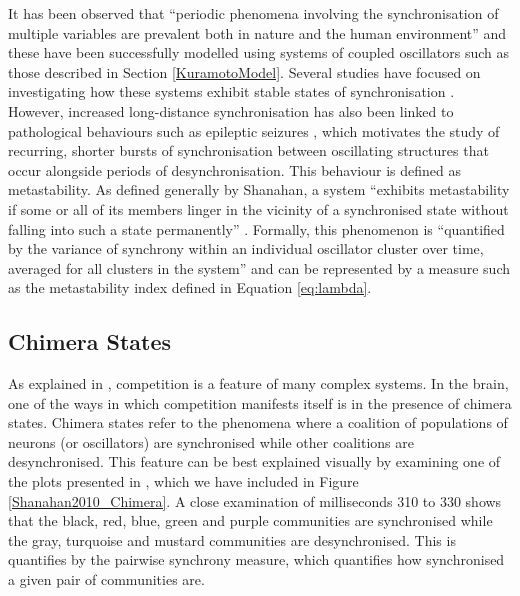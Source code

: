 \documentclass[a4paper,11pt]{article}
\begin{document}
It has been observed that ``periodic phenomena involving the synchronisation of multiple variables are prevalent both in nature and the human environment'' \cite{Shanahan2010} and these have been successfully modelled using systems of coupled oscillators such as those described in Section \ref{KuramotoModel}. Several studies have focused on investigating how these systems exhibit stable states of synchronisation \cite{Acebron2005}. However, increased long-distance synchronisation has also been linked to pathological behaviours such as epileptic seizures \cite{Arthuis2009}, which motivates the study of recurring, shorter bursts of synchronisation between oscillating structures that occur alongside periods of desynchronisation. This behaviour is defined as metastability. As defined generally by Shanahan, a system ``exhibits metastability if some or all of its members linger in the vicinity of a synchronised state without falling into such a state permanently'' \cite{Shanahan2010}. Formally, this phenomenon is ``quantified by the variance of synchrony within an individual oscillator cluster over time, averaged for all clusters in the system'' \cite{Bhowmik2013} and can be represented by a measure such as the metastability index defined in Equation \ref{eq:lambda}.

\subsection{Chimera States}
\label{sec:bg:chimera}

As explained in \cite{Shanahan2010}, competition is a feature of many complex systems. In the brain, one of the ways in which competition manifests itself is in the presence of chimera states. Chimera states refer to the phenomena where a coalition of populations of neurons (or oscillators) are synchronised while other coalitions are desynchronised. This feature can be best explained visually by examining one of the plots presented in \cite{Shanahan2010}, which we have included in Figure \ref{Shanahan2010_Chimera}. A close examination of milliseconds 310 to 330 shows that the black, red, blue, green and purple communities are synchronised while the gray, turquoise and mustard communities are desynchronised. This is quantifies by the pairwise synchrony measure, which quantifies how synchronised a given pair of communities are.
\end{document}
